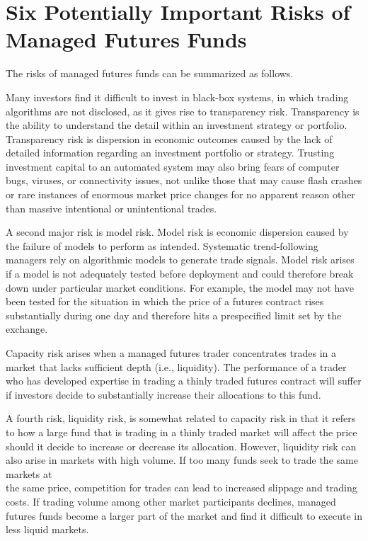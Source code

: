 \documentclass[11pt]{article}
\begin{document}
\section*{Six Potentially Important Risks of Managed Futures Funds}
The risks of managed futures funds can be summarized as follows.

Many investors find it difficult to invest in black-box systems, in which trading algorithms are not disclosed, as it gives rise to transparency risk. Transparency is the ability to understand the detail within an investment strategy or portfolio. Transparency risk is dispersion in economic outcomes caused by the lack of detailed information regarding an investment portfolio or strategy. Trusting investment capital to an automated system may also bring fears of computer bugs, viruses, or connectivity issues, not unlike those that may cause flash crashes or rare instances of enormous market price changes for no apparent reason other than massive intentional or unintentional trades.

A second major risk is model risk. Model risk is economic dispersion caused by the failure of models to perform as intended. Systematic trend-following managers rely on algorithmic models to generate trade signals. Model risk arises if a model is not adequately tested before deployment and could therefore break down under particular market conditions. For example, the model may not have been tested for the situation in which the price of a futures contract rises substantially during one day and therefore hits a prespecified limit set by the exchange.

Capacity risk arises when a managed futures trader concentrates trades in a market that lacks sufficient depth (i.e., liquidity). The performance of a trader who has developed expertise in trading a thinly traded futures contract will suffer if investors decide to substantially increase their allocations to this fund.

A fourth risk, liquidity risk, is somewhat related to capacity risk in that it refers to how a large fund that is trading in a thinly traded market will affect the price should it decide to increase or decrease its allocation. However, liquidity risk can also arise in markets with high volume. If too many funds seek to trade the same markets at\\
the same price, competition for trades can lead to increased slippage and trading costs. If trading volume among other market participants declines, managed futures funds become a larger part of the market and find it difficult to execute in less liquid markets.
\end{document}
